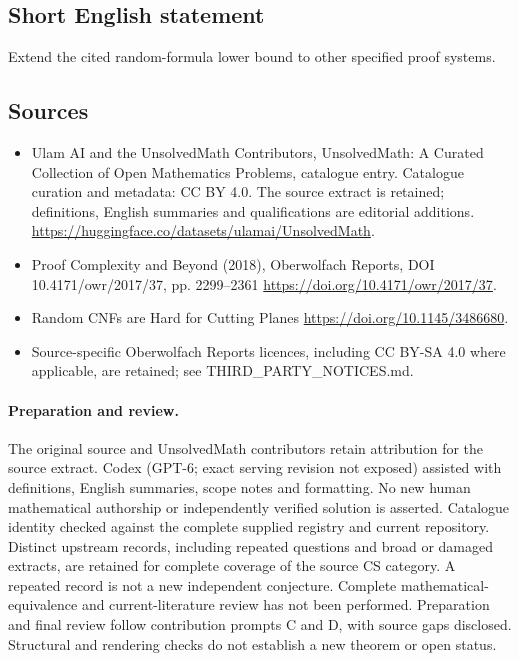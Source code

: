 \documentclass[11pt]{article}
\begin{document}
\subsection{Short English statement}
Extend the cited random-formula lower bound to other specified proof systems.
\subsection{Sources}
\begin{itemize}
\item[\hypertarget{source:statement:1}{S1}] Ulam AI and the UnsolvedMath Contributors, UnsolvedMath: A Curated Collection of Open Mathematics Problems, catalogue entry. Catalogue curation and metadata: CC BY 4.0. The source extract is retained; definitions, English summaries and qualifications are editorial additions.
\url{https://huggingface.co/datasets/ulamai/UnsolvedMath}.
\item[\hypertarget{source:statement:2}{S2}] Proof Complexity and Beyond (2018), Oberwolfach Reports, DOI 10.4171/owr/2017/37, pp. 2299--2361
\url{https://doi.org/10.4171/owr/2017/37}.
\item[\hypertarget{source:statement:3}{S3}] Random CNFs are Hard for Cutting Planes
\url{https://doi.org/10.1145/3486680}.
\item Source-specific Oberwolfach Reports licences, including CC BY-SA 4.0 where applicable, are retained; see THIRD\_PARTY\_NOTICES.md.
\end{itemize}
\paragraph{Preparation and review.}
The original source and UnsolvedMath contributors retain attribution for the source extract. Codex (GPT-6; exact serving revision not exposed) assisted with definitions, English summaries, scope notes and formatting. No new human mathematical authorship or independently verified solution is asserted. Catalogue identity checked against the complete supplied registry and current repository. Distinct upstream records, including repeated questions and broad or damaged extracts, are retained for complete coverage of the source CS category. A repeated record is not a new independent conjecture. Complete mathematical-equivalence and current-literature review has not been performed. Preparation and final review follow contribution prompts C and D, with source gaps disclosed. Structural and rendering checks do not establish a new theorem or open status.
\label{end:statement}
\end{document}
